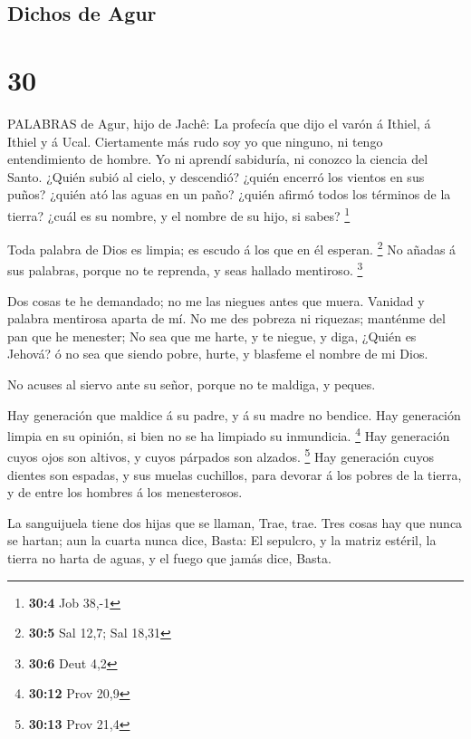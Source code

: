 \hypertarget{dichos-de-agur}{%
\subsection{Dichos de Agur}\label{dichos-de-agur}}

\hypertarget{section-29}{%
\section{30}\label{section-29}}

 PALABRAS de Agur, hijo de Jachê: La profecía que dijo el
varón á Ithiel, á Ithiel y á Ucal.  Ciertamente más rudo soy
yo que ninguno, ni tengo entendimiento de hombre.  Yo ni
aprendí sabiduría, ni conozco la ciencia del Santo.  ¿Quién
subió al cielo, y descendió? ¿quién encerró los vientos en sus puños?
¿quién ató las aguas en un paño? ¿quién afirmó todos los términos de la
tierra? ¿cuál es su nombre, y el nombre de su hijo, si sabes?
\footnote{\textbf{30:4} Job 38,-1}

 Toda palabra de Dios es limpia; es escudo á los que en él
esperan. \footnote{\textbf{30:5} Sal 12,7; Sal 18,31}  No
añadas á sus palabras, porque no te reprenda, y seas hallado mentiroso.
\footnote{\textbf{30:6} Deut 4,2}

 Dos cosas te he demandado; no me las niegues antes que
muera.  Vanidad y palabra mentirosa aparta de mí. No me des
pobreza ni riquezas; manténme del pan que he menester;  No
sea que me harte, y te niegue, y diga, ¿Quién es Jehová? ó no sea que
siendo pobre, hurte, y blasfeme el nombre de mi Dios.

 No acuses al siervo ante su señor, porque no te maldiga, y
peques.

 Hay generación que maldice á su padre, y á su madre no
bendice.  Hay generación limpia en su opinión, si bien no
se ha limpiado su inmundicia. \footnote{\textbf{30:12} Prov 20,9}
 Hay generación cuyos ojos son altivos, y cuyos párpados
son alzados. \footnote{\textbf{30:13} Prov 21,4}  Hay
generación cuyos dientes son espadas, y sus muelas cuchillos, para
devorar á los pobres de la tierra, y de entre los hombres á los
menesterosos.

 La sanguijuela tiene dos hijas que se llaman, Trae, trae.
Tres cosas hay que nunca se hartan; aun la cuarta nunca dice, Basta:
 El sepulcro, y la matriz estéril, la tierra no harta de
aguas, y el fuego que jamás dice, Basta.


